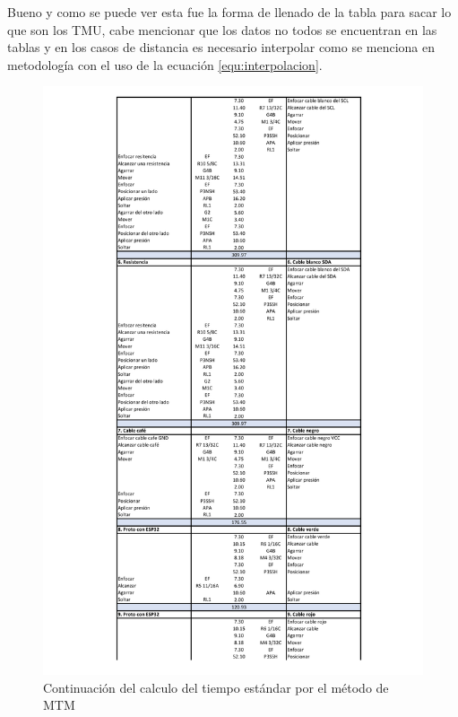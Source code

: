     Bueno y como se puede ver esta fue la forma de llenado de la tabla para sacar lo que son los TMU, cabe mencionar que los datos no todos se encuentran en las tablas y en los casos de distancia es necesario interpolar como se menciona en metodología con el uso de la ecuación \ref{equ:interpolacion}.
    
    
    \begin{figure}[H]
        \centering
        \includegraphics[trim = {20mm 1mm 20mm 1mm},clip,scale=0.3]{22/Img/tiempoEstandarSTP2.pdf}
        \caption{Continuación del calculo del tiempo estándar por el método de MTM}
        \label{fig:STP2}
    \end{figure}
    
